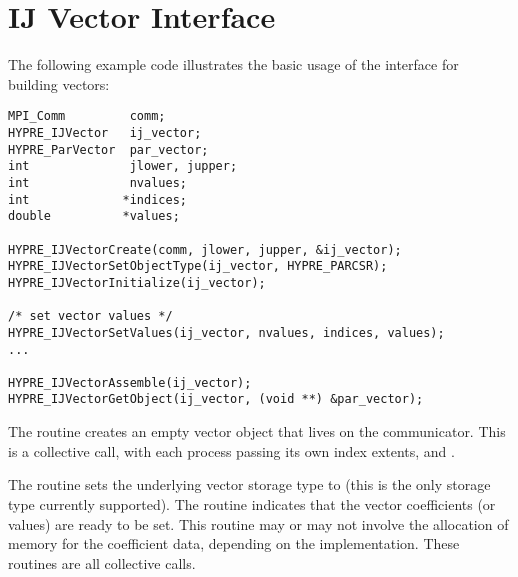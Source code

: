 %


\section{IJ Vector Interface}

The following example code illustrates the basic usage of the
 interface for building vectors:

\begin{display}
\begin{verbatim}
MPI_Comm         comm;
HYPRE_IJVector   ij_vector;
HYPRE_ParVector  par_vector;
int              jlower, jupper;
int              nvalues;
int             *indices;
double          *values;

HYPRE_IJVectorCreate(comm, jlower, jupper, &ij_vector);
HYPRE_IJVectorSetObjectType(ij_vector, HYPRE_PARCSR);
HYPRE_IJVectorInitialize(ij_vector);

/* set vector values */
HYPRE_IJVectorSetValues(ij_vector, nvalues, indices, values);
...

HYPRE_IJVectorAssemble(ij_vector);
HYPRE_IJVectorGetObject(ij_vector, (void **) &par_vector);

\end{verbatim}
\end{display}
The  routine creates an empty vector object that lives
on the  communicator.  This is a collective call, with each
process passing its own index extents,  and .

The  routine sets the underlying vector storage
type to  (this is the only storage type currently
supported).  The  routine indicates that the vector
coefficients (or values) are ready to be set.  This routine may or may
not involve the allocation of memory for the coefficient data,
depending on the implementation.  These routines are all collective
calls.

